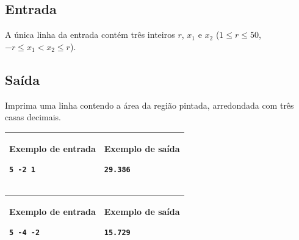 \subsection*{Entrada}

A única linha da entrada contém três inteiros $r$, $x_1$ e $x_2$
($1 \leq r \leq 50$, $-r \leq x_1 < x_2 \leq r$).

\subsection*{Saída}

Imprima uma linha contendo a área da região pintada, arredondada com três casas decimais.

\begin{table}[!h]
\centering
\begin{tabular}{|l|l|}
\hline
\begin{minipage}[t]{3in}
\textbf{Exemplo de entrada}
\begin{verbatim}
5 -2 1
\end{verbatim}
\vspace{1mm}
\end{minipage}
&
\begin{minipage}[t]{3in}
\textbf{Exemplo de saída}
\begin{verbatim}
29.386
\end{verbatim}
\vspace{1mm}
\end{minipage} \\
\hline
\end{tabular}
\end{table}

\begin{table}[!h]
\centering
\begin{tabular}{|l|l|}
\hline
\begin{minipage}[t]{3in}
\textbf{Exemplo de entrada}
\begin{verbatim}
5 -4 -2
\end{verbatim}
\vspace{1mm}
\end{minipage}
&
\begin{minipage}[t]{3in}
\textbf{Exemplo de saída}
\begin{verbatim}
15.729
\end{verbatim}
\vspace{1mm}
\end{minipage} \\
\hline
\end{tabular}
\end{table}

